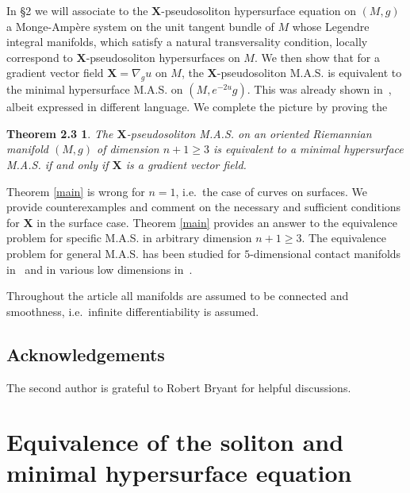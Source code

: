 \documentclass[11pt,letterpaper]{amsart}
\newtheorem*{ct}{Theorem 2.3}
\theoremstyle{definition}
\numberwithin{equation}{section}
\begin{document}
In \S2 we will associate to the ${\mathbf{X}}$-pseudosoliton hypersurface equation on $(M,g)$ a {Monge-Amp\`ere } system on the unit tangent bundle of $M$ whose Legendre integral manifolds, which satisfy a natural transversality condition, locally correspond to ${\mathbf{X}}$-pseudosoliton hypersurfaces on $M$. We then show that for a gradient vector field ${\mathbf{X}}=\nabla_g u$ on $M$, the ${\mathbf{X}}$-pseudosoliton M.A.S. is equivalent to the minimal hypersurface M.A.S. on $(M,e^{-2u}g)$. This was already shown in~\cite{MR1855161}, albeit expressed in different language. We complete the picture by proving the
\begin{ct}
The ${\mathbf{X}}$-pseudosoliton M.A.S. on an oriented Riemannian manifold $(M,g)$ of dimension $n+1\geq 3$ is equivalent to a minimal hypersurface M.A.S. if and only if ${\mathbf{X}}$ is a gradient vector field. 
\end{ct} 
Theorem \ref{main} is wrong for $n=1$, i.e.~the case of curves on surfaces. We provide counterexamples and comment on the necessary and sufficient conditions for ${\mathbf{X}}$ in the surface case. Theorem \ref{main} provides an answer to the equivalence problem for specific M.A.S. in arbitrary dimension $n+1\geq 3$. The equivalence problem for general M.A.S. has been studied for $5$-dimensional contact manifolds in~\cite{MR1985469} and in various low dimensions in~\cite{MR1222276}.  

Throughout the article all manifolds are assumed to be connected and smoothness, i.e.~infinite differentiability is assumed. 

\subsection*{Acknowledgements} The second author is grateful to Robert Bryant for helpful discussions. 

\section{Equivalence of the soliton and minimal hypersurface equation}
\end{document}
